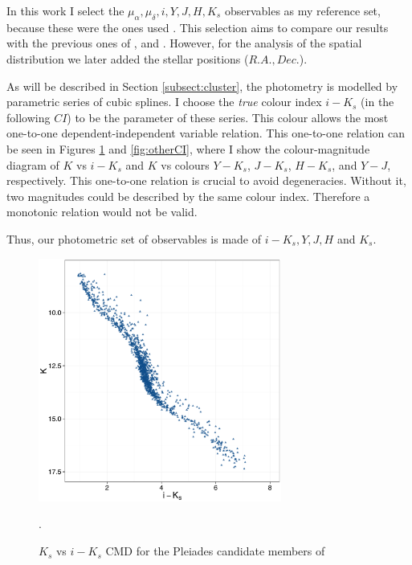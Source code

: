 In this work I select the $\mu_{\alpha},\mu_{\delta},i,Y,J,H,K_s$ observables as my reference set, because these were the ones used \citet{Bouy2015}. This selection aims to compare our results with the previous ones of \citet{Sarro2014}, and \citet{Bouy2015}. However, for the analysis of the spatial distribution we later added the stellar positions ($R.A., Dec.$).

As will be described in Section \ref{subsect:cluster}, the photometry is modelled by parametric series of cubic splines. I choose the \emph{true} colour index $i-K_s$ (in the following $CI$) to be the parameter of these series. This colour allows the most one-to-one dependent-independent variable relation. This one-to-one relation can be seen in Figures \ref{fig:CI} and \ref{fig:otherCI}, where I show the colour-magnitude diagram of $K$ vs $i-K_s$ and $K$ vs colours $Y-K_s$, $J-K_s$, $H-K_s$, and $Y-J$, respectively.  This one-to-one relation is crucial to avoid degeneracies. Without it, two magnitudes could be described by the same colour index. Therefore a monotonic relation would not be valid. 

Thus, our photometric set of observables is made of $i-K_s, Y,J,H$ and $K_s$. 

\begin{figure}[htbp]
\begin{center}
\includegraphics[page=1,height=8cm]{background/Figures/CIs.pdf}
\caption{$K_s$ vs $i-K_s$ CMD for the Pleiades candidate members of \citet{Bouy2015}}.
\label{fig:CI}
\end{center}
\end{figure}

